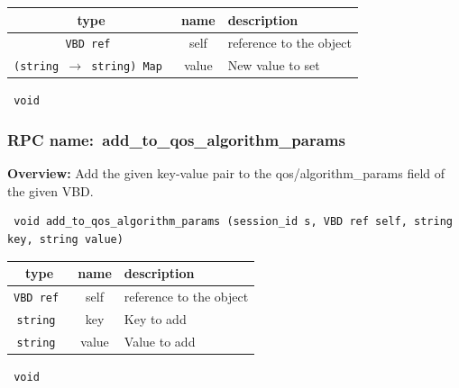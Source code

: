  
\vspace{0.3cm}
\begin{tabular}{|c|c|p{7cm}|}
 \hline
{\bf type} & {\bf name} & {\bf description} \\ \hline
{\tt VBD ref } & self & reference to the object \\ \hline 

{\tt (string $\rightarrow$ string) Map } & value & New value to set \\ \hline 

\end{tabular}

\vspace{0.3cm}

{\tt 
void
}



\vspace{0.3cm}
\vspace{0.3cm}
\vspace{0.3cm}
\subsubsection{RPC name:~add\_to\_qos\_algorithm\_params}

{\bf Overview:} 
Add the given key-value pair to the qos/algorithm\_params field of the
given VBD.

\begin{verbatim} void add_to_qos_algorithm_params (session_id s, VBD ref self, string key, string value)\end{verbatim}



 
\vspace{0.3cm}
\begin{tabular}{|c|c|p{7cm}|}
 \hline
{\bf type} & {\bf name} & {\bf description} \\ \hline
{\tt VBD ref } & self & reference to the object \\ \hline 

{\tt string } & key & Key to add \\ \hline 

{\tt string } & value & Value to add \\ \hline 

\end{tabular}

\vspace{0.3cm}

{\tt 
void
}



